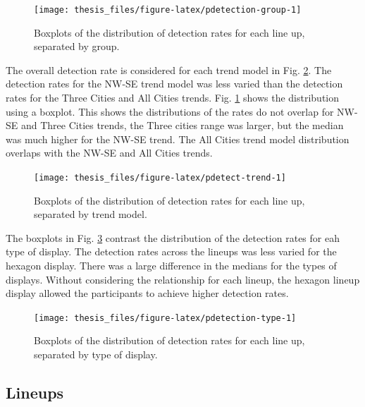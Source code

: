 \documentclass{monashthesis}
\begin{document}
\begin{figure}

{\centering \texttt{[image: thesis\_files/figure-latex/pdetection-group-1]} 

}

\caption{Boxplots of the distribution of detection rates for each line up, separated by group.}\label{fig:pdetection-group}
\end{figure}

The overall detection rate is considered for each trend model in Fig. \ref{fig:pdetect-trend}.
The detection rates for the NW-SE trend model was less varied than the detection rates for the Three Cities and All Cities trends. Fig. \ref{fig:pdetection-group} shows the distribution using a boxplot. This shows the distributions of the rates do not overlap for NW-SE and Three Cities trends, the Three cities range was larger, but the median was much higher for the NW-SE trend. The All Cities trend model distribution overlaps with the NW-SE and All Cities trends.

\begin{figure}

{\centering \texttt{[image: thesis\_files/figure-latex/pdetect-trend-1]} 

}

\caption{Boxplots of the distribution of detection rates for each line up, separated by trend model.}\label{fig:pdetect-trend}
\end{figure}

The boxplots in Fig. \ref{fig:pdetection-type} contrast the distribution of the detection rates for eah type of display.
The detection rates across the lineups was less varied for the hexagon display. There was a large difference in the medians for the types of displays.
Without considering the relationship for each lineup, the hexagon lineup display allowed the participants to achieve higher detection rates.

\begin{figure}

{\centering \texttt{[image: thesis\_files/figure-latex/pdetection-type-1]} 

}

\caption{Boxplots of the distribution of detection rates for each line up, separated by type of display.}\label{fig:pdetection-type}
\end{figure}

\hypertarget{lineups}{%
\subsection{Lineups}\label{lineups}}
\end{document}
